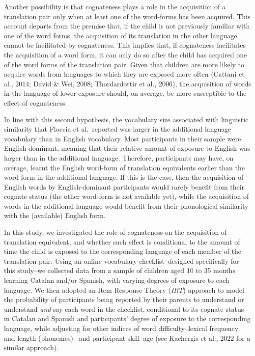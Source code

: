 \documentclass[
  letterpaper,
  DIV=11,
  numbers=noendperiod]{scrartcl}
\begin{document}
Another possibility is that cognateness plays a role in the acquisition
of a translation pair only when at least one of the word-forms has been
acquired. This account departs from the premise that, if the child is
not previously familiar with one of the word forms, the acquisition of
its translation in the other language cannot be facilitated by
cognateness. This implies that, if cognateness facilitates the
acquisition of a word form, it can only do so after the child has
acquired one of the word forms of the translation pair. Given that
children are more likely to acquire words from languages to which they
are exposed more often (Cattani et al., 2014; David \& Wei, 2008;
Thordardottir et al., 2006), the acquisition of words in the language of
lower exposure should, on average, be more susceptible to the effect of
cognateness.

In line with this second hypothesis, the vocabulary size associated with
linguistic similarity that Floccia et al.~reported was larger in the
additional language vocabulary than in English vocabulary. Most
participants in their sample were English-dominant, meaning that their
relative amount of exposure to English was larger than in the additional
language. Therefore, participants may have, on average, learnt the
English word-form of translation equivalents earlier than the word-form
in the additional language. If this is the case, then the acquisition of
English words by English-dominant participants would rarely benefit from
their cognate status (the other word-form is not available yet), while
the acquisition of words in the additional language would benefit from
their phonological similarity with the (available) English form.

In this study, we investigated the role of cognateness on the
acquisition of translation equivalent, and whether such effect is
conditional to the amount of time the child is exposed to the
corresponding language of each member of the translation pair. Using an
online vocabulary checklist--designed specifically for this study--we
collected data from a sample of children aged 10 to 35 months learning
Catalan and/or Spanish, with varying degrees of exposure to each
language. We then adopted an Item Response Theory (\emph{IRT}) approach
to model the probability of participants being reported by their parents
to understand or understand \emph{and} say each word in the checklist,
conditional to its cognate status in Catalan and Spanish and
participants' degree of exposure to the corresponding language, while
adjusting for other indices of word difficulty--lexical frequency and
length (phonemes)-- and participant skill--age (see Kachergis et al.,
2022 for a similar approach).
\end{document}
